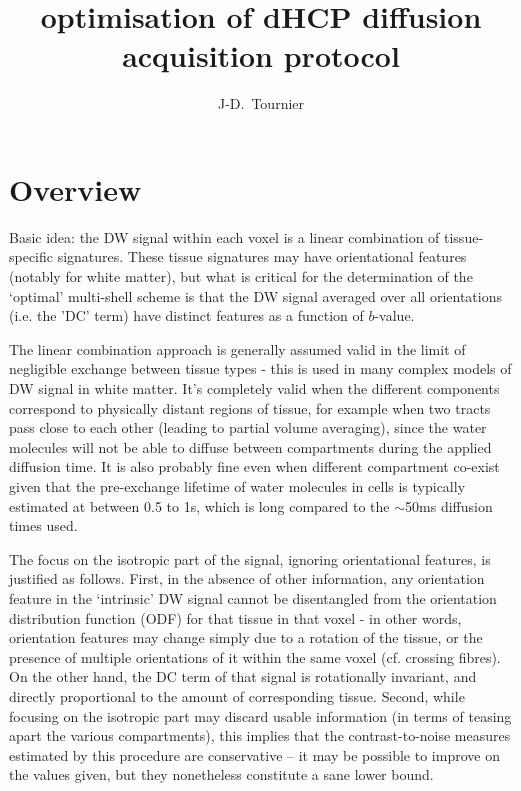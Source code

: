 \documentclass{article}
\author{J-D.~Tournier}
\title{optimisation of dHCP diffusion acquisition protocol}
\begin{document}
\maketitle

\section{Overview}

Basic idea: the DW signal within each voxel is a linear combination of tissue-specific
signatures. These tissue signatures may have orientational features (notably
for white matter), but what is critical for the determination of the `optimal'
multi-shell scheme is that the DW signal averaged over all orientations (i.e.
the 'DC' term) have distinct features as a function of $b$-value. 

The linear combination approach is generally assumed valid in the limit of
negligible exchange between tissue types - this is used in many complex models
of DW signal in white matter. It's completely valid when the different
components correspond to physically distant regions of tissue, for example when
two tracts pass close to each other (leading to partial volume averaging),
since the water molecules will not be able to diffuse between compartments
during the applied diffusion time. It is also probably fine even when different
compartment co-exist given that the pre-exchange lifetime of water molecules in
cells is typically estimated at between 0.5 to 1s, which is long compared to
the $\sim$50ms diffusion times used. 

The focus on the isotropic part of the signal, ignoring orientational features,
is justified as follows. First, in the absence of other information, any
orientation feature in the `intrinsic' DW signal cannot be disentangled from
the orientation distribution function (ODF) for that tissue in that voxel - in
other words, orientation features may change simply due to a rotation of the
tissue, or the presence of multiple orientations of it within the same voxel
(cf. crossing fibres). On the other hand, the DC term of that signal is
rotationally invariant, and directly proportional to the amount of
corresponding tissue. Second, while focusing on the isotropic part may discard
usable information (in terms of teasing apart the various compartments), this
implies that the contrast-to-noise measures estimated by this procedure are 
conservative -- it may be possible to improve on the values given, but they
nonetheless constitute a sane lower bound. 
\end{document}
